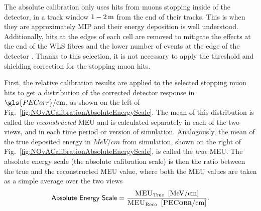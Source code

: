 The absolute calibration only uses hits from muons stopping inside of the detector, in a track window $\unit[1-2]{m}$ from the end of their tracks. This is when they are approximately \gls{MIP} and their energy deposition is well understood. Additionally, hits at the edges of each cell are removed to mitigate the  effects at the end of the \gls{WLS} fibres and the lower number of events at the edge of the detector \cite{NOvA-doc-13579-FACalorimetricEnergyScale}. Thanks to this selection, it is not necessary to apply the threshold and shielding correction for the stopping muon hits.

First, the relative calibration results are applied to the selected stopping muon hits to get a distribution of the corrected detector response in $\gls{PECorr}/\unit{cm}$, as shown on the left of Fig.~\ref{fig:NOvACalibrationAbsoluteEnergyScale}. The mean of this distribution is called the \textit{reconstructed} \gls{MEU} and is calculated separately in each of the two views, and in each time period or version of simulation. Analogously, the mean of the true deposited energy in $\unit{MeV/cm}$ from simulation, shown on the right of Fig.~\ref{fig:NOvACalibrationAbsoluteEnergyScale}, is called the \textit{true} \gls{MEU}. The absolute energy scale (the absolute calibration scale) is then the ratio between the true and the reconstructed \gls{MEU} value, where both  the \gls{MEU} values are taken as a simple average over the two views
\begin{equation}\label{eq:NOvAAbsEnergyScale}
\textsf{Absolute Energy Scale} = \frac{\textsc{MEU}_{\mathrm{True}}\ \left[\unit{MeV/cm}\right]}{\textsc{MEU}_{\mathrm{Reco}}\ \left[\unit{\textsc{PECorr}/cm}\right]}.
\end{equation}

